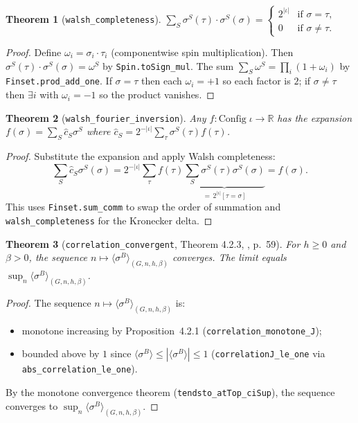 \documentclass[a4paper,11pt]{article}
\newtheorem{theorem}{Theorem}
\begin{document}
\begin{theorem}[\texttt{walsh\_completeness}]
$\sum_S \sigma^S(\tau) \cdot \sigma^S(\sigma) =
\begin{cases} 2^{|\iota|} & \text{if } \sigma = \tau, \\
0 & \text{if } \sigma \ne \tau. \end{cases}$
\end{theorem}

\begin{proof}
Define $\omega_i = \sigma_i \cdot \tau_i$ (componentwise spin
multiplication). Then $\sigma^S(\tau) \cdot \sigma^S(\sigma)
= \omega^S$ by \texttt{Spin.toSign\_mul}. The sum
$\sum_S \omega^S = \prod_i (1 + \omega_i)$ by
\texttt{Finset.prod\_add\_one}. If $\sigma = \tau$ then each
$\omega_i = +1$ so each factor is $2$; if $\sigma \ne \tau$
then $\exists i$ with $\omega_i = -1$ so the product vanishes.
\end{proof}

\begin{theorem}[\texttt{walsh\_fourier\_inversion}]
Any $f : \mathrm{Config}\;\iota \to \mathbb{R}$ has the expansion
$f(\sigma) = \sum_S \hat{c}_S \sigma^S$ where
$\hat{c}_S = 2^{-|\iota|} \sum_\tau \sigma^S(\tau) f(\tau)$.
\end{theorem}

\begin{proof}
Substitute the expansion and apply Walsh completeness:
\[
  \sum_S \hat{c}_S \sigma^S(\sigma)
  = 2^{-|\iota|} \sum_\tau f(\tau)
    \underbrace{\sum_S \sigma^S(\tau) \sigma^S(\sigma)}_{= \, 2^{|\iota|} [\tau = \sigma]}
  = f(\sigma).
\]
This uses \texttt{Finset.sum\_comm} to swap the order of summation
and \texttt{walsh\_completeness} for the Kronecker delta.
\end{proof}

\begin{theorem}[\texttt{correlation\_convergent},
  Theorem 4.2.3, \cite{glimm-jaffe}, p.~59]
For $h \ge 0$ and $\beta > 0$, the sequence
$n \mapsto \langle\sigma^B\rangle_{(G, n, h, \beta)}$ converges.
The limit equals $\sup_n \langle\sigma^B\rangle_{(G, n, h, \beta)}$.
\end{theorem}

\begin{proof}
The sequence $n \mapsto \langle\sigma^B\rangle_{(G, n, h, \beta)}$ is:
\begin{itemize}
  \item monotone increasing by Proposition~4.2.1
    (\texttt{correlation\_monotone\_J});
  \item bounded above by $1$ since
    $\langle\sigma^B\rangle \le |\langle\sigma^B\rangle| \le 1$
    (\texttt{correlationJ\_le\_one} via \texttt{abs\_correlation\_le\_one}).
\end{itemize}
By the monotone convergence theorem (\texttt{tendsto\_atTop\_ciSup}),
the sequence converges to $\sup_n \langle\sigma^B\rangle_{(G, n, h, \beta)}$.
\end{proof}
\end{document}
